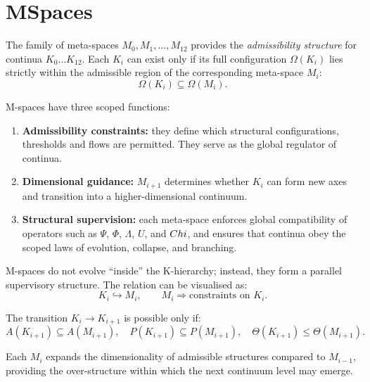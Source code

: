 

\section{MSpaces}
\label{sec:mspaces-overview}

The family of meta-spaces $M_0, M_1, \dots, M_{12}$ provides the
\emph{admissibility structure} for continua $K_0\dots K_{12}$.
Each $K_i$ can exist only if its full configuration
$\Omega(K_i)$ lies strictly within the admissible region of the corresponding
meta-space $M_i$:
\[
\Omega(K_i) \subseteq \Omega(M_i).
\]

M-spaces have three scoped functions:

\begin{enumerate}
    \item \textbf{Admissibility constraints:}
    they define which structural configurations, thresholds and flows are permitted.
    They serve as the global regulator of continua.

    \item \textbf{Dimensional guidance:}
    $M_{i+1}$ determines whether $K_i$ can form new axes and transition
    into a higher-dimensional continuum.

    \item \textbf{Structural supervision:}
    each meta-space enforces global compatibility of operators
    such as $\Psi$, $\Phi$, $\Lambda$, $U$, and $Chi$, and ensures that
    continua obey the scoped laws of evolution, collapse, and branching.
\end{enumerate}

M-spaces do not evolve “inside” the K-hierarchy; instead,
they form a parallel supervisory structure.
The relation can be visualised as:
\[
K_i \hookrightarrow M_i,\qquad
M_i \Rightarrow \text{constraints on } K_i.
\]

The transition $K_i \to K_{i+1}$ is possible only if:
\[
A(K_{i+1}) \subseteq A(M_{i+1}), \quad
P(K_{i+1}) \subseteq P(M_{i+1}),\quad
\Theta(K_{i+1}) \leq \Theta(M_{i+1}).
\]

Each $M_i$ expands the dimensionality of admissible structures compared to
$M_{i-1}$, providing the over-structure within which the next continuum level
may emerge.

